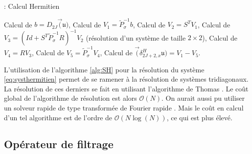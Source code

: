 \begin{center}
\begin{minipage}[H]{12cm}
  \begin{algorithm}[H]
    \caption{: Calcul Hermitien}\label{alg:SH}
    \begin{algorithmic}[1]
    \State Calcul de $b = D_{2J} \vec (\mathfrak{u})$,
	\State Calcul de $V_1 = \tilde{P}_{\sigma}^{-1} b$,
	\State Calcul de $V_2 = S^T V_1$,
	\State Calcul de $V_3 = (Id + S^T \tilde{P}_{\sigma}^{-1}R)^{-1} V_2$ (résolution d'un système de taille $2 \times 2$),
	\State Calcul de $V_4 = R V_3$,
	\State Calcul de $V_5 = \tilde{P}_{\sigma}^{-1} V_4$,
	\State Calcul de $\vec (\delta_{2J+2,x}^H \mathfrak{u}) = V_1 - V_5$.
    \end{algorithmic}
    \end{algorithm}
\end{minipage}
\end{center}

L'utilisation de l'algorithme \ref{alg:SH} pour la résolution du système \eqref{eq:systhermitien} permet de se ramener à la résolution de systèmes tridiagonaux. La résolution de ces derniers se fait en utilisant l'algorithme de Thomas \cite{Conte2017,Quarteroni2010}. Le coût global de l'algorithme de résolution est alors $\mathcal{O}(N)$. On aurait aussi pu utiliser un solveur rapide de type transformée de Fourier rapide \cite{VanLoan1992}. Mais le coût en calcul d'un tel algorithme est de l'ordre de $\mathcal{O}(N \log (N))$, ce qui est plus élevé.























\subsection{Opérateur de filtrage}

